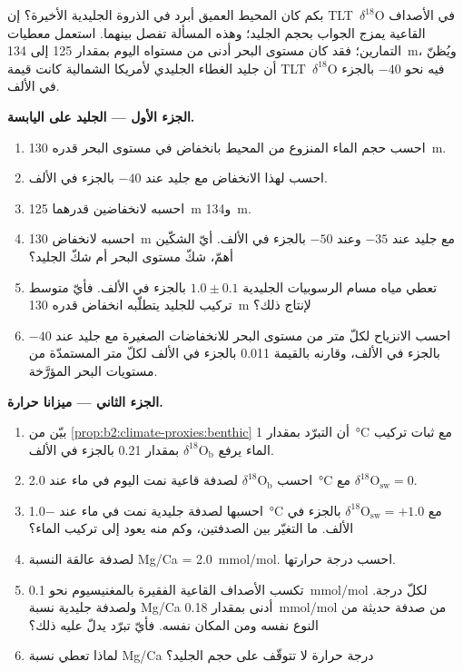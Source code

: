 \begin{problem}\label{pb:b2:climate-proxies:1}
بكم كان المحيط العميق أبرد في الذروة الجليدية الأخيرة؟ إن \mbox{\textdir TLT $\delta^{18}$O} في الأصداف القاعية
يمزج الجواب بحجم الجليد؛ وهذه المسألة تفصل بينهما. استعمل معطيات
التمارين؛ فقد كان مستوى البحر أدنى من مستواه اليوم بمقدار 125 إلى \qty{134}{m}، ويُظنّ أن جليد الغطاء
الجليدي لأمريكا الشمالية كانت قيمة \mbox{\textdir TLT $\delta^{18}$O} فيه نحو $-40$ بالجزء في الألف.

\medskip\noindent\textbf{الجزء الأول --- الجليد على اليابسة.}
\begin{enumerate}
  \item احسب حجم الماء المنزوع من المحيط بانخفاض في مستوى البحر قدره \qty{130}{m}.
  \item احسب  لهذا الانخفاض مع جليد عند $-40$ بالجزء في الألف.
  \item احسبه لانخفاضين قدرهما \qty{125}{m} و\qty{134}{m}.
  \item احسبه لانخفاض \qty{130}{m} مع جليد عند $-35$ وعند $-50$ بالجزء في الألف. أيّ الشكّين
        أهمّ، شكّ مستوى البحر أم شكّ الجليد؟
  \item تعطي مياه مسام الرسوبيات الجليدية $1.0 \pm 0.1$ بالجزء في الألف. فأيّ متوسط تركيب
        للجليد يتطلّبه انخفاض قدره \qty{130}{m} لإنتاج ذلك؟
  \item احسب الانزياح لكلّ متر من مستوى البحر للانخفاضات الصغيرة مع جليد عند $-40$ بالجزء في الألف،
        وقارنه بالقيمة \num{0.011} بالجزء في الألف لكلّ متر المستمدّة من مستويات البحر المؤرَّخة.
\end{enumerate}

\medskip\noindent\textbf{الجزء الثاني --- ميزانا حرارة.}
\begin{enumerate}[resume]
  \item بيّن من \cref{prop:b2:climate-proxies:benthic} أن التبرّد بمقدار \qty{1}{\celsius} مع
        ثبات تركيب الماء يرفع $\delta^{18}\mathrm{O}_{\mathrm{b}}$ بمقدار \num{0.21} بالجزء في الألف.
  \item احسب $\delta^{18}\mathrm{O}_{\mathrm{b}}$ لصدفة قاعية نمت اليوم في ماء عند
        \qty{2.0}{\celsius} مع $\delta^{18}\mathrm{O}_{\mathrm{sw}} = 0$.
  \item احسبها لصدفة جليدية نمت في ماء عند \qty{-1.0}{\celsius} مع
        $\delta^{18}\mathrm{O}_{\mathrm{sw}} = +1.0$ بالجزء في الألف. ما التغيّر بين
        الصدفتين، وكم منه يعود إلى تركيب الماء؟
  \item لصدفة عالقة النسبة Mg/Ca = \qty{2.0}{mmol/mol}. احسب درجة حرارتها.
  \item تكسب الأصداف القاعية الفقيرة بالمغنيسيوم نحو \qty{0.1}{mmol/mol} لكلّ درجة. ولصدفة جليدية
        نسبة Mg/Ca أدنى بمقدار \qty{0.18}{mmol/mol} من صدفة حديثة من النوع نفسه ومن المكان
        نفسه. فأيّ تبرّد يدلّ عليه ذلك؟
  \item لماذا تعطي نسبة Mg/Ca درجة حرارة لا تتوقّف على حجم الجليد؟
\end{enumerate}


\end{problem}
